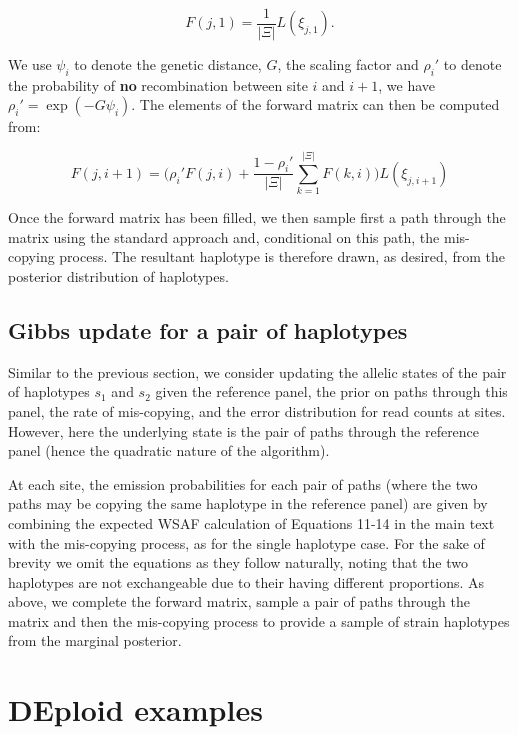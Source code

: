 \documentclass{article}
\begin{document}
\begin{equation}
F(j,1)=\frac{1}{|\Xi|}L(\xi_{j,1}).
\end{equation}

\noindent We use $\psi_i$ to denote the genetic distance, $G$, the scaling factor and $\rho_i'$ to denote the probability of \textbf{no} recombination between site $i$ and $i+1$, we have $\rho_i' = \exp(-G \psi_i)$.  The elements of the forward matrix can then be computed from:

\begin{equation}
F(j,i+1)=\big(\rho_i' F(j,i) + \frac{1-\rho_i'}{|\Xi|}\sum_{k=1}^{|\Xi|}F(k,i)\big) L(\xi_{j,i+1})
\end{equation}


Once the forward matrix has been filled, we then sample first a path through the matrix using the standard approach and, conditional on this path, the mis-copying process.  The resultant haplotype is therefore drawn, as desired, from the posterior distribution of haplotypes.


\subsection{Gibbs update for a pair of haplotypes}

Similar to the previous section, we consider updating the allelic states of the pair of haplotypes $s_1$ and $s_2$ given the reference panel, the prior on paths through this panel, the rate of mis-copying, and the error distribution for read counts at sites.  However, here the underlying state is the pair of paths through the reference panel (hence the quadratic nature of the algorithm).

At each site, the emission probabilities for each pair of paths (where the two paths may be copying the same haplotype in the reference panel) are given by combining the expected WSAF calculation of Equations 11-14 in the main text with the mis-copying process, as for the single haplotype case.  For the sake of brevity we omit the equations as they follow naturally, noting that the two haplotypes are not exchangeable due to their having different proportions.  As above, we complete the forward matrix, sample a pair of paths through the matrix and then the mis-copying process to provide a sample of strain haplotypes from the marginal posterior.





\section{DEploid examples} \label{sup:sec:deploid}
\end{document}
